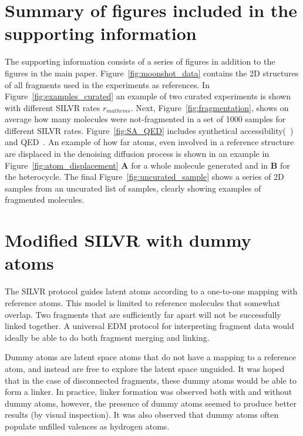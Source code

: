 \documentclass[journal=jacsat,manuscript=article]{achemso}
\begin{document}
\newpage 
\begin{suppinfo}

\section{Summary of figures included in the supporting information}
The supporting information consists of a series of figures in addition to the figures in the main paper. Figure~\ref{fig:moonshot_data} contains the 2D structures of all fragments used in the experiments as references. In Figure~\ref{fig:examples_curated} an example of two curated experiments is shown with different SILVR rates $r_{mathrm{s}}$. Next, Figure~\ref{fig:fragmentation}, shows on average how many molecules were not-fragmented in a set of 1000 samples for different SILVR rates. Figure~\ref{fig:SA_QED} includes synthetical accessibility(~\cite{ertl2009estimation}) and QED~\cite{bickerton2012quantifying, wildman1999prediction}. An example of how far atoms, even involved in a reference structure are displaced in the denoising diffusion process is shown in an example in Figure~\ref{fig:atom_displacement} \textbf{A} for a whole molecule generated and in \textbf{B} for the heterocycle.  The final Figure~\ref{fig:uncurated_sample} shows a series of 2D samples from an uncurated list of samples, clearly showing examples of fragmented molecules.  


\section{Modified SILVR with dummy atoms}
The SILVR protocol guides latent atoms according to a one-to-one mapping with reference atoms. This model is limited to reference molecules that somewhat overlap. Two fragments that are sufficiently far apart will not be successfully linked together. A universal EDM protocol for interpreting fragment data would ideally be able to do both fragment merging and linking.

Dummy atoms are latent space atoms that do not have a mapping to a reference atom, and instead are free to explore the latent space unguided. It was hoped that in the case of disconnected fragments, these dummy atoms would be able to form a linker. In practice, linker formation was observed both with and without dummy atoms, however, the presence of dummy atoms seemed to produce better results (by visual inspection). It was also observed that dummy atoms often populate unfilled valences as hydrogen atoms. 


\end{suppinfo}
\end{document}

